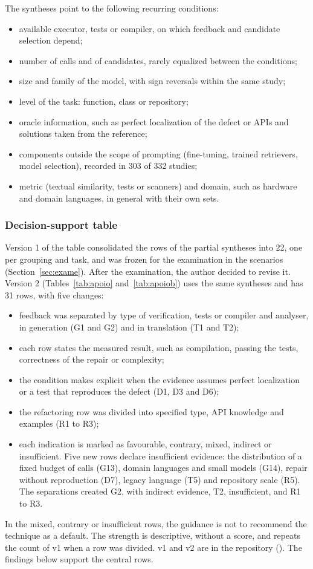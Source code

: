The syntheses point to the following recurring conditions:
\begin{itemize}
  \item available executor, tests or compiler, on which feedback and
    candidate selection depend;
  \item number of calls and of candidates, rarely equalized between the conditions;
  \item size and family of the model, with sign reversals within the same study;
  \item level of the task: function, class or repository;
  \item oracle information, such as perfect localization of the defect or APIs and solutions
    taken from the reference;
  \item components outside the scope of prompting (fine-tuning, trained retrievers,
    model selection), recorded in 303 of 332 studies;
  \item metric (textual similarity, tests or scanners) and domain, such as hardware and
    domain languages, in general with their own sets.
\end{itemize}

\subsubsection{Decision-support table}

Version 1 of the table consolidated the rows of the partial syntheses into 22, one per grouping
and task, and was frozen for the examination in the scenarios (Section~\ref{sec:exame}). After the
examination, the author decided to revise it. Version 2 (Tables~\ref{tab:apoio} and~\ref{tab:apoiob})
uses the same syntheses and has 31 rows, with five changes:
\begin{itemize}
  \item feedback was separated by type of verification, tests or compiler and
  analyser, in generation (G1 and G2) and in translation (T1 and T2);
  \item each row states the measured result, such as compilation, passing the tests,
  correctness of the repair or complexity;
  \item the condition makes explicit when the evidence assumes perfect localization or a test that
  reproduces the defect (D1, D3 and D6);
  \item the refactoring row was divided into specified type, API knowledge and
  examples (R1 to R3);
  \item each indication is marked as favourable, contrary, mixed, indirect or
  insufficient. Five new rows declare insufficient evidence: the distribution of a
  fixed budget of calls (G13), domain languages and small models (G14), repair
  without reproduction (D7), legacy language (T5) and repository scale (R5). The separations
  created G2, with indirect evidence, T2, insufficient, and R1 to R3.
\end{itemize}
In the mixed, contrary or insufficient rows, the guidance is not to recommend the technique
as a default. The strength is descriptive, without a score, and repeats the count of v1 when a row was
divided. v1 and v2 are in the repository (). The findings
below support the central rows.

